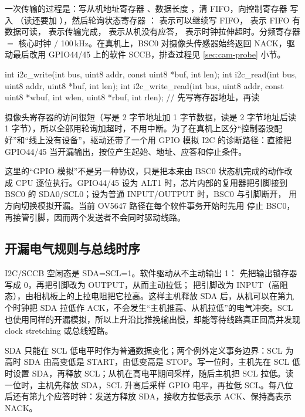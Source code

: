 一次传输的过程是：写从机地址寄存器 、数据长度 ，清 FIFO，向控制寄存器  写入 （读还要加 ），然后轮询状态寄存器 ： 表示可以继续写 FIFO， 表示 FIFO 有数据可读， 表示传输完成， 表示从机没有应答， 表示时钟拉伸超时。分频寄存器  $=$ 核心时钟 $/$ 100\,kHz。在真机上，BSC0 对摄像头传感器始终返回 NACK，驱动最后改用 GPIO44/45 上的软件 SCCB，排查过程见 \ref{sec:cam-probe} 小节。

\begin{ccode}
int i2c_write(int bus, uint8 addr, const uint8 *buf, int len);
int i2c_read(int bus, uint8 addr, uint8 *buf, int len);
int i2c_write_read(int bus, uint8 addr, const uint8 *wbuf, int wlen,
                   uint8 *rbuf, int rlen);     // 先写寄存器地址，再读
\end{ccode}

摄像头寄存器的访问很短（写是 2 字节地址加 1 字节数据，读是 2 字节地址后读 1 字节），所以全部用轮询加超时，不用中断。为了在真机上区分“控制器没配好”和“线上没有设备”，驱动还带了一个用 GPIO 模拟 I2C 的诊断路径：直接把 GPIO44/45 当开漏输出，按位产生起始、地址、应答和停止条件。

这里的“GPIO 模拟”不是另一种协议，只是把本来由 BSC0 状态机完成的动作改成 CPU 逐位执行。GPIO44/45 设为 ALT1 时，芯片内部的复用器把引脚接到 BSC0 的 SDA0/SCL0；设为普通 INPUT/OUTPUT 时，BSC0 与引脚断开， 用方向切换模拟开漏。当前 OV5647 路径在每个软件事务开始时先用  停止 BSC0，再接管引脚，因而两个发送者不会同时驱动线路。

\subsection{开漏电气规则与总线时序}

I2C/SCCB 空闲态是 SDA=SCL=1。软件驱动从不主动输出 1： 先把输出锁存器写成 0，再把引脚改为 OUTPUT，从而主动拉低； 把引脚改为 INPUT（高阻态），由相机板上的上拉电阻把它拉高。这样主机释放 SDA 后，从机可以在第九个时钟把 SDA 拉低作 ACK，不会发生“主机推高、从机拉低”的电气冲突。SCL 也使用同样的开漏模拟，所以上升沿比推挽输出慢，却能等待线路真正回高并发现 clock stretching 或总线短路。

SDA 只能在 SCL 低电平时作为普通数据变化；两个例外定义事务边界：SCL 为高时 SDA 由高变低是 START，由低变高是 STOP。写一位时，主机先在 SCL 低时设置 SDA，再释放 SCL；从机在高电平期间采样，随后主机把 SCL 拉低。读一位时，主机先释放 SDA，SCL 升高后采样 GPIO 电平，再拉低 SCL。每八位后还有第九个应答时钟：发送方释放 SDA，接收方拉低表示 ACK、保持高表示 NACK。

